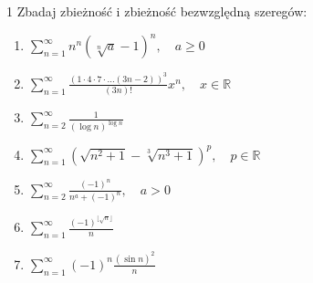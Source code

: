 \documentclass{../note}
\begin{document}
\begin{zadanie}{1}
Zbadaj zbieżność i zbieżność bezwzględną szeregów:

\begin{enumerate}[label=(\alph*)]
    \item $\displaystyle \sum_{n=1}^{\infty}n^{n}(\sqrt[n]{a}-1)^{n}, \quad a\ge0$
    
    \item $\displaystyle \sum_{n=1}^{\infty}\frac{(1\cdot4\cdot7\cdot...(3n-2))^{3}}{(3n)!}x^{n}, \quad x\in\mathbb{R}$
    
    \item $\displaystyle \sum_{n=2}^{\infty}\frac{1}{(\log n)^{\log n}}$
    
    \item $\displaystyle \sum_{n=1}^{\infty}(\sqrt{n^{2}+1}-\sqrt[3]{n^{3}+1})^{p}, \quad p\in\mathbb{R}$
    
    \item $\displaystyle \sum_{n=2}^{\infty}\frac{(-1)^{n}}{n^{a}+(-1)^{n}}, \quad a>0$
    
    \item $\displaystyle \sum_{n=1}^{\infty}\frac{(-1)^{\lfloor\sqrt{n}\rfloor}}{n}$
    
    \item $\displaystyle \sum_{n=1}^{\infty}(-1)^{n}\frac{(\sin n)^{2}}{n}$
\end{enumerate}
\end{zadanie}
\end{document}
